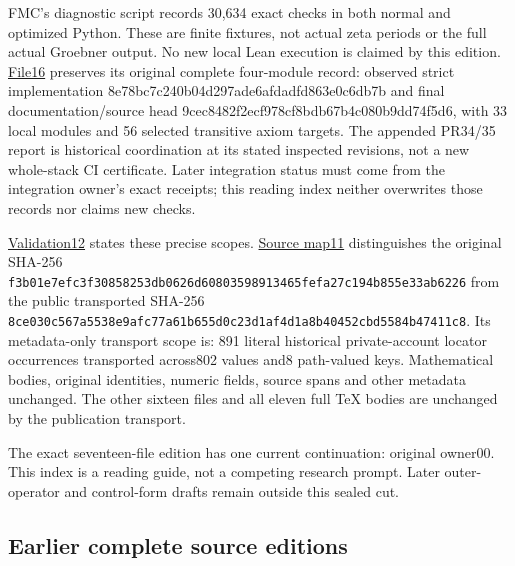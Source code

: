 \documentclass[
]{article}
\begin{document}
FMC's diagnostic script records 30,634 exact checks in both normal and
optimized Python. These are finite fixtures, not actual zeta periods or
the full actual Groebner output. No new local Lean execution is claimed
by this edition.
\href{https://github.com/KokunoYumeto/zeta-function-research-reader/blob/af5c17948c24f43494ea76d823322e8b3924b58d/workbenches/splitzero-tandem/continuations/20260915-first-variation-continuation/16_PR32_FORMAL_SOURCE_AND_PROOFS.md}{File16}
preserves its original complete four-module record: observed strict
implementation 8e78bc7c240b04d297ade6afdadfd863e0c6db7b and final
documentation/source head 9cec8482f2ecf978cf8bdb67b4c080b9dd74f5d6, with
33 local modules and 56 selected transitive axiom targets. The appended
PR34/35 report is historical coordination at its stated inspected
revisions, not a new whole-stack CI certificate. Later integration
status must come from the integration owner's exact receipts; this
reading index neither overwrites those records nor claims new checks.

\href{https://github.com/KokunoYumeto/zeta-function-research-reader/blob/af5c17948c24f43494ea76d823322e8b3924b58d/workbenches/splitzero-tandem/continuations/20260915-first-variation-continuation/12_VALIDATION.md}{Validation12}
states these precise scopes.
\href{https://github.com/KokunoYumeto/zeta-function-research-reader/blob/af5c17948c24f43494ea76d823322e8b3924b58d/workbenches/splitzero-tandem/continuations/20260915-first-variation-continuation/11_SOURCE_MAP.json}{Source
map11} distinguishes the original SHA-256
\texttt{f3b01e7efc3f30858253db0626d60803598913465fefa27c194b855e33ab6226}
from the public transported SHA-256
\texttt{8ce030c567a5538e9afc77a61b655d0c23d1af4d1a8b40452cbd5584b47411c8}.
Its metadata-only transport scope is: 891 literal historical
private-account locator occurrences transported across802 values and8
path-valued keys. Mathematical bodies, original identities, numeric
fields, source spans and other metadata unchanged. The other sixteen
files and all eleven full TeX bodies are unchanged by the publication
transport.

The exact seventeen-file edition has one current continuation: original
owner00. This index is a reading guide, not a competing research prompt.
Later outer-operator and control-form drafts remain outside this sealed
cut.

\subsection{Earlier complete source
editions}\label{earlier-complete-source-editions}
\end{document}
